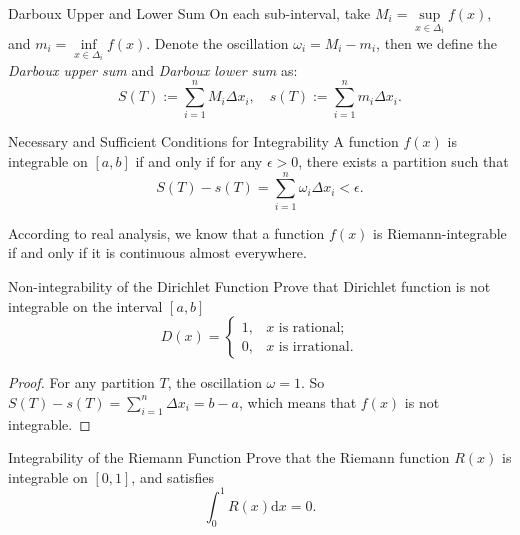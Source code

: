 \begin{definition}{Darboux Upper and Lower Sum}{}
  On each sub-interval, take $M_i = \sup \limits_{x \in \Delta_i} f(x)$,
  and $m_i = \inf \limits_{x \in \Delta_i} f(x)$.
  Denote the oscillation $\omega_i = M_i - m_i$,
  then we define the \emph{Darboux upper sum} and \emph{Darboux lower sum} as:
  \begin{equation}
    S(T) := \sum\limits_{i = 1}^n M_i \Delta x_i, \quad
    s(T) := \sum\limits_{i = 1}^n m_i \Delta x_i.
  \end{equation}
\end{definition}

\begin{proposition}{Necessary and Sufficient Conditions for Integrability}{}
  A function $f(x)$ is integrable on $[a, b]$ if and only if
  for any $\epsilon > 0$, there exists a partition such that
  \begin{equation}
    S(T) - s(T) = \sum\limits_{i = 1}^n \omega_i \Delta x_i < \epsilon.
  \end{equation}
\end{proposition}

\begin{note}
  According to real analysis, we know that a function $f(x)$ is
  Riemann-integrable if and only if it is continuous almost everywhere.
\end{note}

\begin{example}{Non-integrability of the Dirichlet Function}{}
  Prove that Dirichlet function is not integrable on the interval $[a, b]$
  \begin{equation}
    D(x) =
    \begin{cases}
      1, & x \text{ is rational};\\
      0, & x \text{ is irrational}.
    \end{cases}
  \end{equation}
\end{example}

\begin{proof}
  For any partition $T$,
  the oscillation $\omega = 1$.
  So $S(T) - s(T) = \sum\limits_{i = 1}^n \Delta x_i = b - a$,
  which means that $f(x)$ is not integrable.
\end{proof}

\begin{example}{Integrability of the Riemann Function}{}
  Prove that the Riemann function $R(x)$ is integrable on $[0, 1]$,
  and satisfies
  \begin{equation}
    \int_0^1 R(x) \mathrm{d} x = 0.
  \end{equation}
\end{example}

